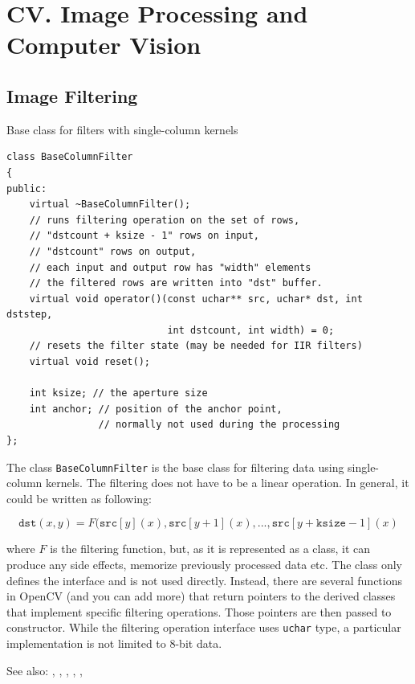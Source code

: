 \section{CV. Image Processing and Computer Vision}

\subsection{Image Filtering}

\label{BaseColumnFilter}
Base class for filters with single-column kernels

\begin{lstlisting}
class BaseColumnFilter
{
public:
    virtual ~BaseColumnFilter();
    // runs filtering operation on the set of rows,
    // "dstcount + ksize - 1" rows on input,
    // "dstcount" rows on output,
    // each input and output row has "width" elements
    // the filtered rows are written into "dst" buffer.
    virtual void operator()(const uchar** src, uchar* dst, int dststep,
                            int dstcount, int width) = 0;
    // resets the filter state (may be needed for IIR filters)
    virtual void reset();
    
    int ksize; // the aperture size
    int anchor; // position of the anchor point,
                // normally not used during the processing
};
\end{lstlisting}

The class \texttt{BaseColumnFilter} is the base class for filtering data using single-column kernels. The filtering does not have to be a linear operation. In general, it could be written as following:

\[\texttt{dst}(x,y) = F(\texttt{src}[y](x), \texttt{src}[y+1](x), ..., \texttt{src}[y+\texttt{ksize}-1](x)\]

where $F$ is the filtering function, but, as it is represented as a class, it can produce any side effects, memorize previously processed data etc. The class only defines the interface and is not used directly. Instead, there are several functions in OpenCV (and you can add more) that return pointers to the derived classes that implement specific filtering operations. Those pointers are then passed to  constructor. While the filtering operation interface uses \texttt{uchar} type, a particular implementation is not limited to 8-bit data.

See also: , , ,
    , , 


